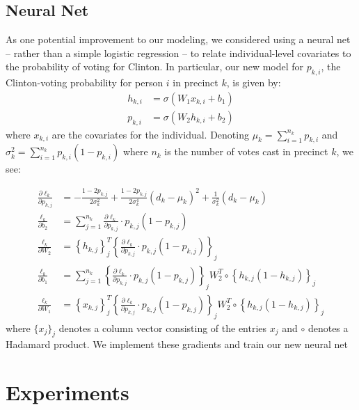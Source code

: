 \documentclass[10pt, letterpaper]{article}
\begin{document}
\subsection{Neural Net} 
As one potential improvement to our modeling, we considered using a neural net -- rather than a simple logistic regression -- to relate individual-level covariates to the probability of voting for Clinton. In particular, our new model for $p_{k, i}$, the Clinton-voting probability for person $i$ in precinct $k$, is given by: 
\begin{align*}
h_{k, i} &= \sigma\left(W_1 x_{k, i} + b_1 \right) \\
p_{k, i} &= \sigma\left(W_2 h_{k, i} + b_2 \right) 
\end{align*}
where $x_{k, i}$ are the covariates for the individual. Denoting $\mu_k = \sum_{i = 1}^{n_k} p_{k, i}$ and $\sigma_k^2 = \sum_{i = 1}^{n_k} p_{k, i} (1 - p_{k, i})$ where $n_k$ is the number of votes cast in precinct $k$, we see: 

\begin{align*}
\frac{\partial \ell_k}{\partial p_{k, j}} &= - \frac{1 - 2p_{k, j}}{2 \sigma_k^2} + \frac{1 - 2p_{k, j}}{2 \sigma_k^4} (d_k - \mu_k)^2  + \frac{1}{\sigma_k^2} \left(d_k - \mu_k \right) \\
\frac{\ell_k}{\partial b_2} &= \sum_{j = 1}^{n_k} \frac{\partial \ell_k}{\partial p_{k, j}} \cdot p_{k, j} (1 - p_{k, j}) \\
\frac{\ell_k}{\partial W_2} &= \left\{ h_{k, j} \right\}_j^T \left\{ \frac{\partial \ell_k}{\partial p_{k, j}} \cdot p_{k, j} (1 - p_{k, j})\right\}_{j} \\
\frac{\ell_k}{\partial b_1} &= \sum_{j = 1}^{n_k} \left\{ \frac{\partial \ell_k}{\partial p_{k, j}} \cdot p_{k, j} (1 - p_{k, j})\right\}_{j} W_2^T \circ \left\{ h_{k, j}(1 - h_{k, j})\right\}_j \\
\frac{\ell_k}{\partial W_1} &= \left\{ x_{k, j} \right\}_j^T \left\{ \frac{\partial \ell_k}{\partial p_{k, j}} \cdot p_{k, j} (1 - p_{k, j})\right\}_{j} W_2^T \circ \left\{ h_{k, j}(1 - h_{k, j})\right\}_j
\end{align*}
where $\{x_j\}_j$ denotes a column vector consisting of the entries $x_j$ and $\circ$ denotes a Hadamard product. We implement these gradients and train our new neural net


\section{Experiments}
\end{document}
